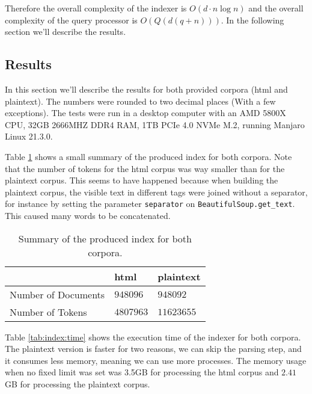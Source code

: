 \documentclass[sigconf,authorversion,nonacm]{acmart}
\def\code#1{\texttt{#1}}
\begin{document}
Therefore the overall complexity of the indexer is $O(d \cdot n\log n)$ and the overall complexity of the query processor is $O(Q(d(q + n)))$. In the following section we'll describe the results.

\subsection{Results}

In this section we'll describe the results for both provided corpora (html and plaintext). The numbers were rounded to two decimal places (With a few exceptions). The tests were run in a desktop computer with an AMD 5800X CPU, 32GB 2666MHZ DDR4 RAM, 1TB PCIe 4.0 NVMe M.2, running Manjaro Linux 21.3.0.

Table \ref{tab:index:dt} shows a small summary of the produced index for both corpora. Note that the number of tokens for the html corpus was way smaller than for the plaintext corpus. This seems to have happened because when building the plaintext corpus, the visible text in different tags were joined without a separator, for instance by setting the parameter \code{separator} on \code{BeautifulSoup.get\_text}. This caused many words to be concatenated.


\begin{table}[H]
  \caption{Summary of the produced index for both corpora.}
  \label{tab:index:dt}

  \begin{tabular}{lll}
                        & html      & plaintext  \\
    \toprule
    Number of Documents & $948096$  & $948092$   \\
    Number of Tokens    & $4807963$ & $11623655$ \\
    \bottomrule
  \end{tabular}
\end{table}

Table \ref{tab:index:time} shows the execution time of the indexer for both corpora. The plaintext version is faster for two reasons, we can skip the parsing step, and it consumes less memory, meaning we can use more processes. The memory usage when no fixed limit was set was 3.5GB for processing the html corpus and $2.41$GB for processing the plaintext corpus.
\end{document}
